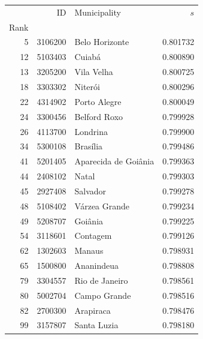\begin{table}[]
    \centering
    \begin{tabular}{rrlr}
    \toprule
     & ID & Municipality & $s$ \\
    Rank &  &  &  \\
    \midrule
    5 & 3106200 & Belo Horizonte & 0.801732 \\
    12 & 5103403 & Cuiabá & 0.800890 \\
    13 & 3205200 & Vila Velha & 0.800725 \\
    18 & 3303302 & Niterói & 0.800296 \\
    22 & 4314902 & Porto Alegre & 0.800049 \\
    24 & 3300456 & Belford Roxo & 0.799928 \\
    26 & 4113700 & Londrina & 0.799900 \\
    34 & 5300108 & Brasília & 0.799486 \\
    41 & 5201405 & Aparecida de Goiânia & 0.799363 \\
    44 & 2408102 & Natal & 0.799303 \\
    45 & 2927408 & Salvador & 0.799278 \\
    48 & 5108402 & Várzea Grande & 0.799234 \\
    49 & 5208707 & Goiânia & 0.799225 \\
    54 & 3118601 & Contagem & 0.799126 \\
    62 & 1302603 & Manaus & 0.798931 \\
    65 & 1500800 & Ananindeua & 0.798808 \\
    79 & 3304557 & Rio de Janeiro & 0.798561 \\
    80 & 5002704 & Campo Grande & 0.798516 \\
    82 & 2700300 & Arapiraca & 0.798476 \\
    99 & 3157807 & Santa Luzia & 0.798180 \\
    \bottomrule
    \end{tabular}
    
    \label{tab:placeholder}
\end{table}